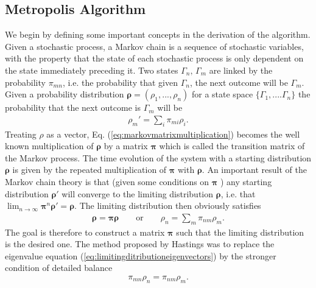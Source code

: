 \subsection{Metropolis Algorithm}
\label{subsec:metropolisalgorithm}
We begin by defining some important concepts in the derivation of the algorithm. Given a stochastic process, a Markov chain is a sequence of stochastic variables, with the property that the state of each stochastic process is only dependent on the state immediately preceding it.
Two states $\Gamma_n,\, \Gamma_m$ are linked by the probability $\pi_{mn}$, i.e. the probability that given $\Gamma_n$, the next outcome will be $\Gamma_m$. Given a probability distribution $\boldsymbol{\rho} = (\rho_1,...,\rho_n) $ for a state space $\{\Gamma_1,....\Gamma_n\}$ the probability that the next outcome is $\Gamma_m$ will be 
\begin{align}
\label{eq:markovmatrixmultiplication}
\rho_m' = \displaystyle\sum_i \pi_{mi} \rho_i.
\end{align}
Treating $\mathbb{\rho}$ as a vector, Eq. (\ref{eq:markovmatrixmultiplication}) becomes the well known multiplication of $\boldsymbol{\rho}$ by a matrix $\boldsymbol{\pi}$ which is called the transition matrix of the Markov process.
The time evolution of the system with a starting distribution $\boldsymbol{\rho}$ is given by the repeated multiplication of $\boldsymbol{\pi}$ with $\boldsymbol{\rho}$. An important result of the Markov chain theory is that (given some conditions on $\boldsymbol{\pi}$ \cite{grimmett2001probability,allen1987computer}) any starting distribution $\boldsymbol{\rho'}$ will converge to the limiting distribution $\boldsymbol{\rho}$, i.e. that $\displaystyle\lim_{n\to \infty} \boldsymbol{\pi}^n \boldsymbol{\rho'} = \boldsymbol{\rho}$. The limiting distribution then obviously satisfies 
\begin{align}
    \label{eq:limitingditributioneigenvectors}
    \boldsymbol{\rho} = \boldsymbol{\pi} \boldsymbol{\rho} \qquad \text{or} \qquad \rho_n = \displaystyle\sum_m \pi_{nm} \rho_m.
\end{align}
The goal is therefore to construct a matrix $\boldsymbol{\pi}$ such that the limiting distribution is the desired one. The method proposed by Hastings \cite{hastings1970monte} was to replace the eigenvalue equation (\ref{eq:limitingditributioneigenvectors}) by the stronger condition of detailed balance
\begin{align}
    \label{eq:detailedbalance}
    \pi_{mn} \rho_n = \pi_{nm} \rho_m.
\end{align}
